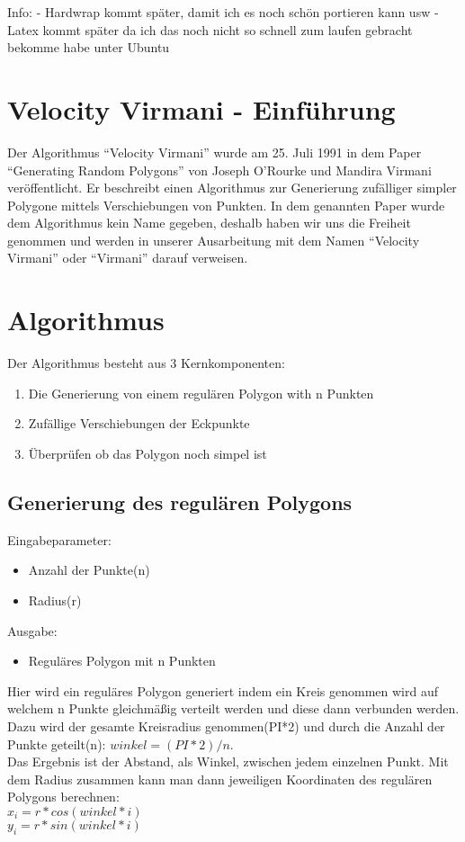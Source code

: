 Info: 
	- Hardwrap kommt später, damit ich es noch schön portieren kann usw
	- Latex kommt später da ich das noch nicht so schnell zum laufen gebracht bekomme habe unter Ubuntu

\section{Velocity Virmani - Einführung}
Der Algorithmus \enquote{Velocity Virmani} wurde am 25. Juli 1991 in dem Paper \enquote{Generating Random Polygons} von Joseph O'Rourke und Mandira Virmani veröffentlicht. Er beschreibt einen Algorithmus zur Generierung zufälliger simpler Polygone mittels Verschiebungen von Punkten. In dem genannten Paper wurde dem Algorithmus kein Name gegeben, deshalb haben wir uns die Freiheit genommen und werden in unserer Ausarbeitung mit dem Namen \enquote{Velocity Virmani} oder \enquote{Virmani} darauf verweisen.

\section{Algorithmus}
Der Algorithmus besteht aus 3 Kernkomponenten:
\begin{enumerate}
	\item Die Generierung von einem regulären Polygon with n Punkten
	\item Zufällige Verschiebungen der Eckpunkte
	\item Überprüfen ob das Polygon noch simpel ist
\end{enumerate}

\subsection{Generierung des regulären Polygons}
Eingabeparameter: 
\begin{itemize}
	\item Anzahl der Punkte(n)
	\item Radius(r)
\end{itemize}
Ausgabe:
\begin{itemize} 
	\item Reguläres Polygon mit n Punkten
\end{itemize}
Hier wird ein reguläres Polygon generiert indem ein Kreis genommen wird auf welchem n Punkte gleichmäßig verteilt werden und diese dann verbunden werden. Dazu wird der gesamte Kreisradius genommen(PI*2) und durch die Anzahl der Punkte geteilt(n): $winkel = (PI * 2) / n$.\\ 
Das Ergebnis ist der Abstand, als Winkel, zwischen jedem einzelnen Punkt.
Mit dem Radius zusammen kann man dann jeweiligen Koordinaten des regulären Polygons berechnen:\\
$x_i = r * cos(winkel * i)$\\
$y_i = r * sin(winkel * i)$

